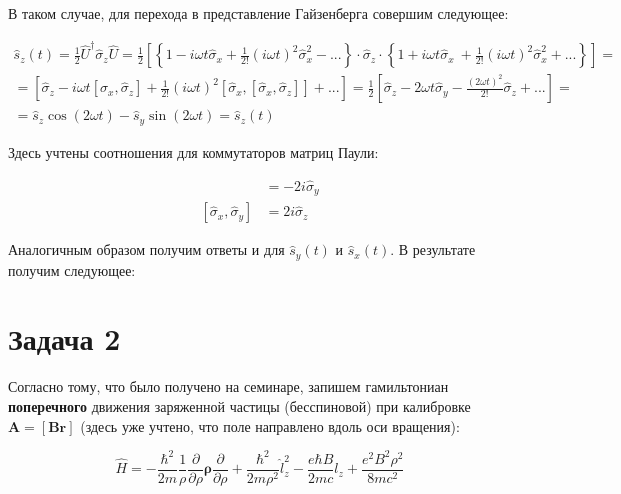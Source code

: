 \documentclass[a4paper, 12pt]{article}
\newcommand*\widefbox[1]{\fbox{\hspace{2em}#1\hspace{2em}}}
\begin{document}
В таком случае, для перехода в представление Гайзенберга совершим следующее:

\begin{align*}
	\hat{s}_z(t) = \frac{1}{2} \hat{U}^\dagger \hat{\sigma}_z \hat{U} = 
	\frac{1}{2} \left[\left\{1 - i\omega t \hat{\sigma}_x + \frac{1}{2!}(i \omega t)^2 \hat{\sigma}_x^2 - ...\right\} \cdot \hat{\sigma}_z \cdot \left\{1 + i\omega t \hat{\sigma}_x\ + \frac{1}{2!}(i \omega t)^2 \hat{\sigma}_x^2 + ...\right\} \right] = \\
	= \left[\hat{\sigma}_z - i\omega t [\hat{\sigma}_x,\hat{\sigma}_z] + \frac{1}{2!} (i\omega t)^2 [\hat{\sigma}_x, [\hat{\sigma}_x, \hat{\sigma}_z]] + ... \right] = 
	\frac{1}{2} \left[\hat{\sigma}_z - 2 \omega t \hat{\sigma}_y - \frac{(2\omega t)^2}{2!} \hat{\sigma}_z + ... \right] = \\
	= \boxed{\hat{s}_z \cos\left(2\omega t\right) - \hat{s}_y \sin\left(2 \omega t\right) = \hat{s}_z(t)}
\end{align*} 

Здесь учтены соотношения для коммутаторов матриц Паули:

\begin{align*}
	[\hat{\sigma}_x, \hat{\sigma}_z] &= - 2 i \hat{\sigma}_y\\
	[\hat{\sigma}_x, \hat{\sigma}_y] &= 2 i \hat{\sigma}_z
\end{align*}

Аналогичным образом получим ответы и для $\hat{s}_y(t)$ и $\hat{s}_x(t)$. В результате получим следующее:


\section*{Задача 2}

Согласно тому, что было получено на семинаре, запишем гамильтониан \textbf{поперечного} движения заряженной частицы (бесспиновой) при калибровке $\mathbf{A} = [\mathbf{B}\mathbf{r}]$ (здесь уже учтено, что поле направлено вдоль оси вращения):

\begin{equation*}
	\hat{H} = - \frac{\hbar^2}{2 m} \frac{1}{\rho}\frac{\partial}{\partial \rho} \mathbf{\rho} \frac{\partial}{\partial \rho} + \frac{\hbar^2}{2 m \rho^2} \hat{l}^2_z - \frac{e \hbar B}{2 m c} l_z + \frac{e^2 B^2 \rho^2}{8 m c^2}
\end{equation*}
\end{document}
